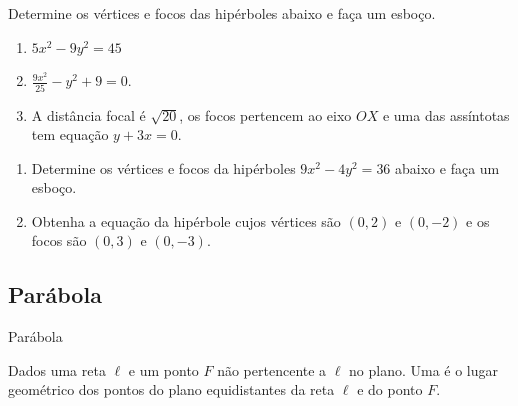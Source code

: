 \begin{frame}[label=conicas]
	\begin{exe}
		Determine os vértices e focos das hipérboles abaixo e faça um esboço.
		\begin{enumerate}
			\item $5x^2-9y^2=45$
			\item $\frac{9x^2}{25}-y^2+9=0$.
			
			\item A distância focal é $\sqrt{20}$, os focos pertencem ao eixo $OX$ e uma das assíntotas tem equação $y+3x=0$.
		\end{enumerate}
	\end{exe}
	
	
\end{frame}

\begin{frame}[label=conicas]
	
	\begin{casa}
	\begin{enumerate}
		\item 	Determine os vértices e focos da hipérboles $9x^2-4y^2=36$ abaixo e faça um esboço.
		
			\item Obtenha a equação da hipérbole cujos vértices são $(0,2)$ e $(0,-2)$ e os focos são $(0,3)$ e $(0,-3)$.
	\end{enumerate}
	\end{casa}
	
\end{frame}



\subsection*{Parábola}



\begin{frame}[label=conicas]{Parábola}
	\begin{defin}[Parábola]
		Dados uma reta $\ell$  e um ponto $F$ não pertencente a $\ell$ no plano. Uma  é o lugar geométrico dos pontos do plano equidistantes da reta $\ell$ e do ponto $F$. 
	\end{defin}
	\begin{center}
	\end{center}
	
\end{frame}



